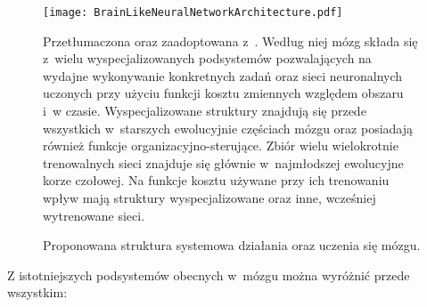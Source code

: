 \begin{figure}[ht]
	\texttt{[image: BrainLikeNeuralNetworkArchitecture.pdf]}
	\caption{Proponowana struktura systemowa działania oraz uczenia się mózgu.}
	Przetłumaczona oraz zaadoptowana z~\cite{marblestone2016toward}.
	Według niej mózg składa się z~wielu wyspecjalizowanych podsystemów pozwalających na wydajne wykonywanie konkretnych zadań oraz sieci neuronalnych uczonych przy użyciu funkcji kosztu zmiennych względem obszaru i~w czasie.
	Wyspecjalizowane struktury znajdują się przede wszystkich w~starszych ewolucyjnie częściach mózgu oraz posiadają również funkcje organizacyjno-sterujące.
	Zbiór wielu wielokrotnie trenowalnych sieci znajduje się głównie w~najmłodszej ewolucyjne korze czołowej.
	Na funkcje kosztu używane przy ich trenowaniu wpływ mają struktury wyspecjalizowane oraz inne, wcześniej wytrenowane sieci.
	\label{fig:structure-with-specialized-systems}
\end{figure}

Z istotniejszych podsystemów obecnych w~mózgu można wyróżnić przede wszystkim:

